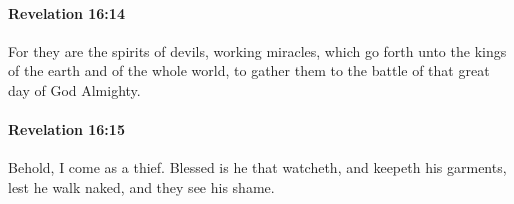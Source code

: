		\paragraph{Revelation 16:14} %
			\label{REVELATIONNT-16-14}

			For they are the spirits of devils, working miracles, which go forth unto the kings of the earth and of the whole world, to gather them to the battle of that great day of God Almighty.

			\begin{framed}
			\scriptsize
				\begin{compactdesc}
					\item[SBLG] 
				\end{compactdesc}
			\end{framed}

		\paragraph{Revelation 16:15} %
			\label{REVELATIONNT-16-15}

			Behold, I come as a thief. Blessed is he that watcheth, and keepeth his garments, lest he walk naked, and they see his shame.

